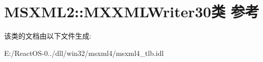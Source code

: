 \hypertarget{class_m_s_x_m_l2_1_1_m_x_x_m_l_writer30}{}\section{M\+S\+X\+M\+L2\+:\+:M\+X\+X\+M\+L\+Writer30类 参考}
\label{class_m_s_x_m_l2_1_1_m_x_x_m_l_writer30}


该类的文档由以下文件生成\+:\begin{DoxyCompactItemize}
\item 
E\+:/\+React\+O\+S-\/0../dll/win32/msxml4/msxml4\+\_\+tlb.\+idl\end{DoxyCompactItemize}

